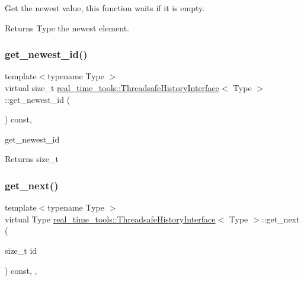 Get the newest value, this function waits if it is empty. 

\begin{DoxyReturn}{Returns}
Type the newest element. 
\end{DoxyReturn}
\mbox{\label{classreal__time__tools_1_1ThreadsafeHistoryInterface_a3455ddd9e556045b17ab05307f4d3f51}} 
\subsubsection{\texorpdfstring{get\+\_\+newest\+\_\+id()}{get\_newest\_id()}}
{\footnotesize\ttfamily template$<$typename Type $>$ \\
virtual size\+\_\+t \hyperlink{classreal__time__tools_1_1ThreadsafeHistoryInterface}{real\+\_\+time\+\_\+tools\+::\+Threadsafe\+History\+Interface}$<$ Type $>$\+::get\+\_\+newest\+\_\+id (\begin{DoxyParamCaption}{ }\end{DoxyParamCaption}) const\hspace{0.3cm}{\ttfamily [private]}, {}}



get\+\_\+newest\+\_\+id 

\begin{DoxyReturn}{Returns}
size\+\_\+t 
\end{DoxyReturn}
\mbox{\label{classreal__time__tools_1_1ThreadsafeHistoryInterface_af9541280de2b560e833b826befb0545d}} 
\subsubsection{\texorpdfstring{get\+\_\+next()}{get\_next()}}
{\footnotesize\ttfamily template$<$typename Type $>$ \\
virtual Type \hyperlink{classreal__time__tools_1_1ThreadsafeHistoryInterface}{real\+\_\+time\+\_\+tools\+::\+Threadsafe\+History\+Interface}$<$ Type $>$\+::get\+\_\+next (\begin{DoxyParamCaption}\item[{size\+\_\+t}]{id }\end{DoxyParamCaption}) const\hspace{0.3cm}{\ttfamily [inline]}, {\ttfamily [private]}, {\ttfamily [virtual]}}



